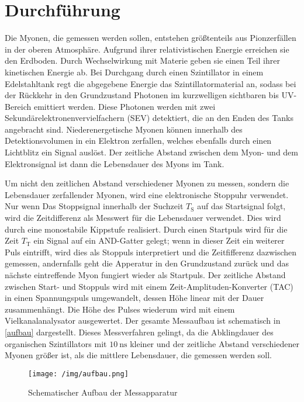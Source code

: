 \section{Durchf\"{u}hrung}

Die Myonen, die gemessen werden sollen, entstehen größtenteils aus Pionzerfällen in der oberen Atmosphäre. Aufgrund ihrer relativistischen Energie erreichen sie den Erdboden. Durch Wechselwirkung mit Materie geben sie einen Teil ihrer kinetischen Energie ab. Bei Durchgang durch einen Szintillator in einem Edelstahltank regt die abgegebene Energie das Szintillatormaterial an, sodass bei der Rückkehr in den Grundzustand Photonen im kurzwelligen sichtbaren bis UV-Bereich emittiert werden. Diese Photonen werden mit zwei Sekundärelektronenvervielfachern (SEV) detektiert, die an den Enden des Tanks angebracht sind. Niederenergetische Myonen können innerhalb des Detektionsvolumen in ein Elektron zerfallen, welches ebenfalls durch einen Lichtblitz ein Signal auslöst. Der zeitliche Abstand zwischen dem Myon- und dem Elektronsignal ist dann die Lebensdauer des Myons im Tank.\par

Um nicht den zeitlichen Abstand verschiedener Myonen zu messen, sondern die Lebensdauer zerfallender Myonen, wird eine elektronische Stoppuhr verwendet. Nur wenn Das Stoppsignal innerhalb der Suchzeit $T_\text{S}$ auf das Startsignal folgt, wird die Zeitdifferenz als Messwert für die Lebensdauer verwendet. Dies wird durch eine monostabile Kippstufe realisiert. Durch einen Startpuls wird für die Zeit $T_\text{T}$ ein Signal auf ein AND-Gatter gelegt; wenn in dieser Zeit ein weiterer Puls eintrifft, wird dies als Stoppuls interpretiert und die Zeitfifferenz dazwischen gemessen, andernfalls geht die Apperatur in den Grundzustand zurück und das nächste eintreffende Myon fungiert wieder als Startpuls. Der zeitliche Abstand zwischen Start- und Stoppuls wird mit einem Zeit-Amplituden-Konverter (TAC) in einen Spannungspuls umgewandelt, dessen Höhe linear mit der Dauer zusammenhängt. Die Höhe des Pulses wiederum wird mit einem Vielkanalanalysator ausgewertet. Der gesamte Messaufbau ist schematisch in \autoref{aufbau} dargestellt. Dieses Messverfahren gelingt, da die Abklingdauer des organischen Szintillators mit $\SI{10}{\nano\second}$ kleiner und der zeitliche Abstand verschiedener Myonen größer ist, als die mittlere Lebensdauer, die gemessen werden soll.\par

\begin{figure}
  \texttt{[image: /img/aufbau.png]}
  \caption{Schematischer Aufbau der Messapparatur \cite{FP}}
  \label{aufbau}
\end{figure}

